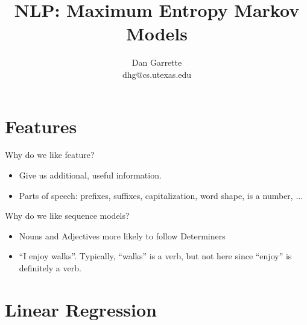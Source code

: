 \documentclass[11pt,letterpaper]{article}
\title{NLP: Maximum Entropy Markov Models}
\author{Dan Garrette\\\small{dhg@cs.utexas.edu}}
\begin{document}
\maketitle



\section{Features}

Why do we like feature?

\begin{itemize}
  \item Give us additional, useful information.
  \item Parts of speech: prefixes, suffixes, capitalization, word shape, is a number, ...
\end{itemize}

Why do we like sequence models?

\begin{itemize}
  \item Nouns and Adjectives more likely to follow Determiners
  \item ``I enjoy walks''.  Typically, ``walks'' is a verb, but not here since ``enjoy'' is definitely a verb.
\end{itemize}



\section{Linear Regression}
\end{document}
